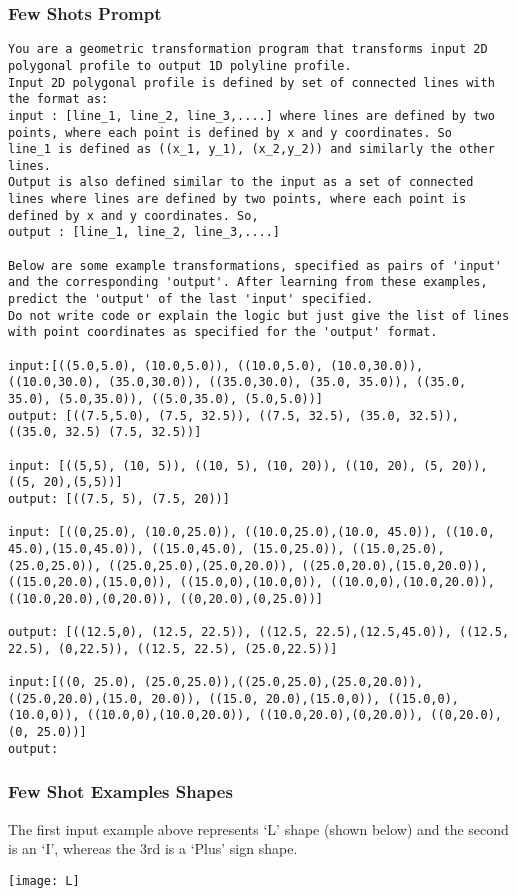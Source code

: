 \begin{frame}[fragile]\frametitle{Few Shots Prompt}
\begin{lstlisting}
You are a geometric transformation program that transforms input 2D polygonal profile to output 1D polyline profile. 
Input 2D polygonal profile is defined by set of connected lines with the format as:
input : [line_1, line_2, line_3,....] where lines are defined by two points, where each point is defined by x and y coordinates. So
line_1 is defined as ((x_1, y_1), (x_2,y_2)) and similarly the other lines.
Output is also defined similar to the input as a set of connected lines where lines are defined by two points, where each point is defined by x and y coordinates. So,
output : [line_1, line_2, line_3,....]

Below are some example transformations, specified as pairs of 'input' and the corresponding 'output'. After learning from these examples, predict the 'output' of the last 'input' specified.
Do not write code or explain the logic but just give the list of lines with point coordinates as specified for the 'output' format.

input:[((5.0,5.0), (10.0,5.0)), ((10.0,5.0), (10.0,30.0)), ((10.0,30.0), (35.0,30.0)), ((35.0,30.0), (35.0, 35.0)), ((35.0, 35.0), (5.0,35.0)), ((5.0,35.0), (5.0,5.0))]
output: [((7.5,5.0), (7.5, 32.5)), ((7.5, 32.5), (35.0, 32.5)), ((35.0, 32.5) (7.5, 32.5))]

input: [((5,5), (10, 5)), ((10, 5), (10, 20)), ((10, 20), (5, 20)), ((5, 20),(5,5))]
output: [((7.5, 5), (7.5, 20))]

input: [((0,25.0), (10.0,25.0)), ((10.0,25.0),(10.0, 45.0)), ((10.0, 45.0),(15.0,45.0)), ((15.0,45.0), (15.0,25.0)), ((15.0,25.0),(25.0,25.0)), ((25.0,25.0),(25.0,20.0)), ((25.0,20.0),(15.0,20.0)), ((15.0,20.0),(15.0,0)), ((15.0,0),(10.0,0)), ((10.0,0),(10.0,20.0)), ((10.0,20.0),(0,20.0)), ((0,20.0),(0,25.0))]

output: [((12.5,0), (12.5, 22.5)), ((12.5, 22.5),(12.5,45.0)), ((12.5, 22.5), (0,22.5)), ((12.5, 22.5), (25.0,22.5))]

input:[((0, 25.0), (25.0,25.0)),((25.0,25.0),(25.0,20.0)), ((25.0,20.0),(15.0, 20.0)), ((15.0, 20.0),(15.0,0)), ((15.0,0),(10.0,0)), ((10.0,0),(10.0,20.0)), ((10.0,20.0),(0,20.0)), ((0,20.0),(0, 25.0))]
output:
\end{lstlisting}	
\end{frame}

\begin{frame}[fragile]\frametitle{Few Shot Examples Shapes}
The first input example above represents ‘L’ shape (shown below) and the second is an ‘I’, whereas the 3rd is a ‘Plus’ sign shape.

\begin{center}
\texttt{[image: L]}
\end{center}	
\end{frame}

